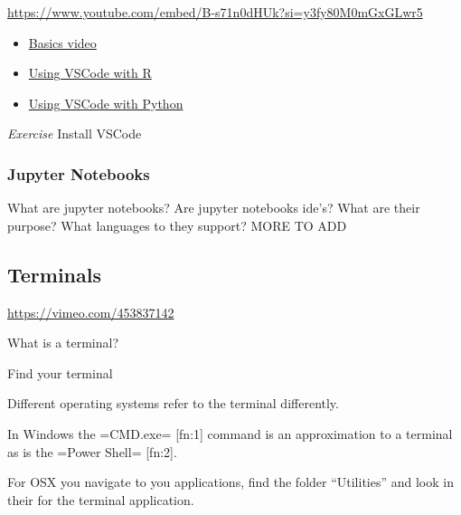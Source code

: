 \documentclass[
  letterpaper,
  DIV=11,
  numbers=noendperiod]{scrreprt}
\providecommand{\tightlist}{%
  \setlength{\itemsep}{0pt}\setlength{\parskip}{0pt}}\usepackage{longtable,booktabs,array}
\begin{document}
\url{https://www.youtube.com/embed/B-s71n0dHUk?si=y3fy80M0mGxGLwr5}

\begin{itemize}
\tightlist
\item
  \href{https://code.visualstudio.com/docs/introvideos/basics}{Basics
  video}
\item
  \href{https://code.visualstudio.com/docs/languages/r}{Using VSCode
  with R}
\item
  \href{https://code.visualstudio.com/docs/languages/python}{Using
  VSCode with Python}
\end{itemize}

\emph{Exercise} Install VSCode

\subsubsection{Jupyter Notebooks}\label{jupyter-notebooks}

What are jupyter notebooks? Are jupyter notebooks ide's? What are their
purpose? What languages to they support? MORE TO ADD

\subsection{Terminals}\label{terminals}

\url{https://vimeo.com/453837142}

\begin{tcolorbox}[enhanced jigsaw, opacityback=0, leftrule=.75mm, colback=white, left=2mm, titlerule=0mm, toprule=.15mm, toptitle=1mm, coltitle=black, title=\textcolor{quarto-callout-tip-color}{\faLightbulb}\hspace{0.5em}{Class Question}, opacitybacktitle=0.6, colbacktitle=quarto-callout-tip-color!10!white, breakable, bottomrule=.15mm, bottomtitle=1mm, colframe=quarto-callout-tip-color-frame, arc=.35mm, rightrule=.15mm]

What is a terminal?

\end{tcolorbox}

Find your terminal

Different operating systems refer to the terminal differently.

In Windows the =CMD.exe= {[}fn:1{]} command is an approximation to a
terminal as is the =Power Shell= {[}fn:2{]}.

For OSX you navigate to you applications, find the folder ``Utilities''
and look in their for the terminal application.
\end{document}

